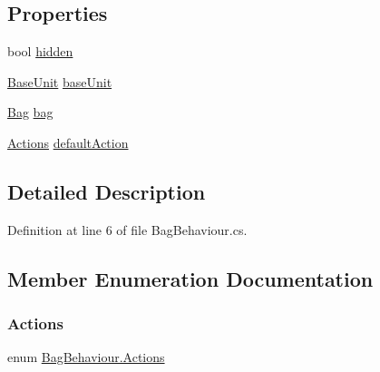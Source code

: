 \subsection*{Properties}
\begin{DoxyCompactItemize}
\item 
bool \mbox{\hyperlink{class_bag_behaviour_a20616261b25fffc37c9b9d68c3994bbe}{hidden}}
\item 
\mbox{\hyperlink{class_base_unit}{Base\+Unit}} \mbox{\hyperlink{class_bag_behaviour_a902e05fcee6312ba24825f3d9f785b8b}{base\+Unit}}
\item 
\mbox{\hyperlink{class_bag}{Bag}} \mbox{\hyperlink{class_bag_behaviour_a2ce7c6b9e26738b42f953a3351b8b1b4}{bag}}
\item 
\mbox{\hyperlink{class_bag_behaviour_aeafbbbda3c9a34d1a73647a8b274788c}{Actions}} \mbox{\hyperlink{class_bag_behaviour_aee692afcced72398af07f9df77990b09}{default\+Action}}
\end{DoxyCompactItemize}


\subsection{Detailed Description}


Definition at line 6 of file Bag\+Behaviour.\+cs.



\subsection{Member Enumeration Documentation}
\mbox{\label{class_bag_behaviour_aeafbbbda3c9a34d1a73647a8b274788c}} 
\subsubsection{\texorpdfstring{Actions}{Actions}}
{\footnotesize\ttfamily enum \mbox{\hyperlink{class_bag_behaviour_aeafbbbda3c9a34d1a73647a8b274788c}{Bag\+Behaviour.\+Actions}}\hspace{0.3cm}{\ttfamily [strong]}}

